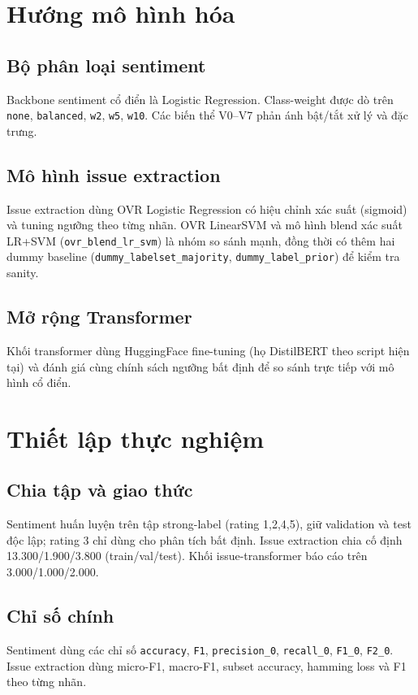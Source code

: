 ﻿\documentclass[12pt,a4paper]{article}
\begin{document}
\section{Hướng mô hình hóa}
\subsection{Bộ phân loại sentiment}
Backbone sentiment cổ điển là Logistic Regression. Class-weight được dò trên \texttt{none}, \texttt{balanced}, \texttt{w2}, \texttt{w5}, \texttt{w10}. Các biến thể V0--V7 phản ánh bật/tắt xử lý và đặc trưng.

\subsection{Mô hình issue extraction}
Issue extraction dùng OVR Logistic Regression có hiệu chỉnh xác suất (sigmoid) và tuning ngưỡng theo từng nhãn. OVR LinearSVM và mô hình blend xác suất LR+SVM (\texttt{ovr\_blend\_lr\_svm}) là nhóm so sánh mạnh, đồng thời có thêm hai dummy baseline (\texttt{dummy\_labelset\_majority}, \texttt{dummy\_label\_prior}) để kiểm tra sanity.

\subsection{Mở rộng Transformer}
Khối transformer dùng HuggingFace fine-tuning (họ DistilBERT theo script hiện tại) và đánh giá cùng chính sách ngưỡng bất định để so sánh trực tiếp với mô hình cổ điển.

\section{Thiết lập thực nghiệm}
\subsection{Chia tập và giao thức}
Sentiment huấn luyện trên tập strong-label (rating 1,2,4,5), giữ validation và test độc lập; rating 3 chỉ dùng cho phân tích bất định. Issue extraction chia cố định 13.300/1.900/3.800 (train/val/test). Khối issue-transformer báo cáo trên 3.000/1.000/2.000.

\subsection{Chỉ số chính}
Sentiment dùng các chỉ số \texttt{accuracy}, \texttt{F1}, \texttt{precision\_0}, \texttt{recall\_0}, \texttt{F1\_0}, \texttt{F2\_0}. Issue extraction dùng micro-F1, macro-F1, subset accuracy, hamming loss và F1 theo từng nhãn.
\end{document}
